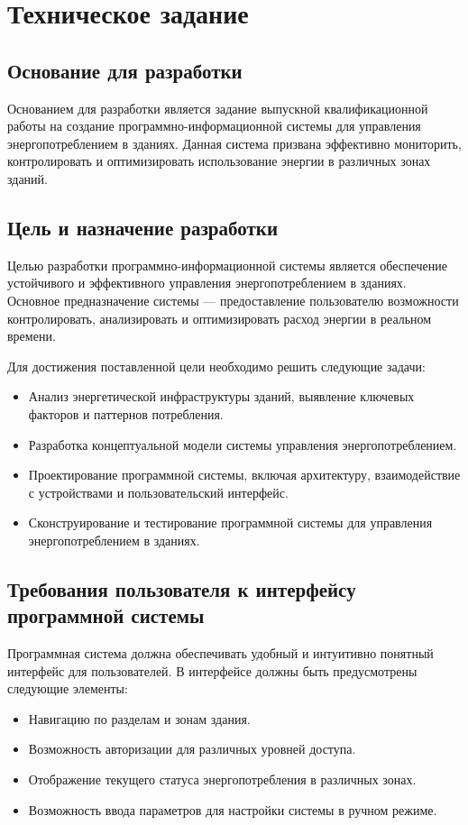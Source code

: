 \section{Техническое задание}
\subsection{Основание для разработки}

Основанием для разработки является задание выпускной квалификационной работы на создание программно-информационной системы для управления энергопотреблением в зданиях. Данная система призвана эффективно мониторить, контролировать и оптимизировать использование энергии в различных зонах зданий.

\subsection{Цель и назначение разработки}

Целью разработки программно-информационной системы является обеспечение устойчивого и эффективного управления энергопотреблением в зданиях. Основное предназначение системы — предоставление пользователю возможности контролировать, анализировать и оптимизировать расход энергии в реальном времени.

Для достижения поставленной цели необходимо решить следующие задачи:
\begin{itemize}
	\item Анализ энергетической инфраструктуры зданий, выявление ключевых факторов и паттернов потребления.
	\item Разработка концептуальной модели системы управления энергопотреблением.
	\item Проектирование программной системы, включая архитектуру, взаимодействие с устройствами и пользовательский интерфейс.
	\item Сконструирование и тестирование программной системы для управления энергопотреблением в зданиях.
\end{itemize}

\subsection{Требования пользователя к интерфейсу программной системы}

Программная система должна обеспечивать удобный и интуитивно понятный интерфейс для пользователей. В интерфейсе должны быть предусмотрены следующие элементы:
\begin{itemize}
	\item Навигацию по разделам и зонам здания.
	\item Возможность авторизации для различных уровней доступа.
	\item Отображение текущего статуса энергопотребления в различных зонах.
	\item Возможность ввода параметров для настройки системы в ручном режиме.
\end{itemize}

